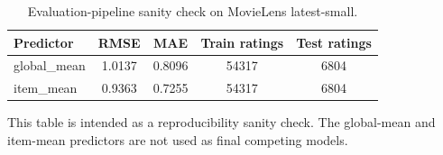 \begin{table}[htbp]
\centering
\caption{Evaluation-pipeline sanity check on MovieLens latest-small.}
\label{tab:appendix_baseline_smoke_test}
\begin{tabular}{lcccc}
\toprule
Predictor & RMSE & MAE & Train ratings & Test ratings \\
\midrule
global\_mean & 1.0137 & 0.8096 & 54317 & 6804 \\
item\_mean & 0.9363 & 0.7255 & 54317 & 6804 \\
\bottomrule
\end{tabular}
\vspace{0.35em}
\begin{minipage}{0.92\textwidth}
\footnotesize This table is intended as a reproducibility sanity check. The global-mean and item-mean predictors are not used as final competing models.
\end{minipage}
\end{table}
